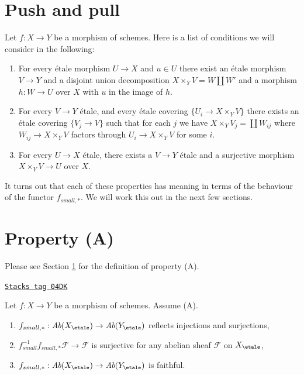 \section{Push and pull}
\label{etale-cohomology-section-monomorphisms}
Let $f : X \to Y$ be a morphism of schemes.
Here is a list of conditions we will consider in the following:
\begin{enumerate}
\item[(A)] For every \'etale morphism $U \to X$ and $u \in U$ there exist
an \'etale morphism $V \to Y$ and a disjoint union decomposition
$X \times_Y V = W \amalg W'$ and a morphism $h : W \to U$ over $X$
with $u$ in the image of $h$.
\item[(B)] For every $V \to Y$ \'etale, and every \'etale covering
$\{U_i \to X \times_Y V\}$ there exists an \'etale covering
$\{V_j \to V\}$ such that for each $j$ we have
$X \times_Y V_j = \coprod W_{ij}$ where $W_{ij} \to X \times_Y V$
factors through $U_i \to X \times_Y V$ for some $i$.
\item[(C)] For every $U \to X$ \'etale, there exists a $V \to Y$ \'etale
and a surjective morphism $X \times_Y V \to U$ over $X$.
\end{enumerate}
It turns out that each of these properties has meaning in terms of
the behaviour of the functor $f_{small, *}$. We will work this
out in the next few sections.

\section{Property (A)}
\label{etale-cohomology-section-A}
Please see Section \ref{etale-cohomology-section-monomorphisms} for the definition of property
(A).

\begin{lemma}
\label{etale-cohomology-lemma-property-A-implies}
\href{https://stacks.math.columbia.edu/tag/04DK}{\texttt{Stacks tag 04DK}}

Let $f : X \to Y$ be a morphism of schemes.
Assume (A).
\begin{enumerate}
\item
$f_{small, *} :
\textit{Ab}(X_\etale)
\to
\textit{Ab}(Y_\etale)$
reflects injections and surjections,
\item $f_{small}^{-1}f_{small, *}\mathcal{F} \to \mathcal{F}$
is surjective for any abelian sheaf $\mathcal{F}$ on $X_\etale$,
\item
$f_{small, *} :
\textit{Ab}(X_\etale)
\to
\textit{Ab}(Y_\etale)$
is faithful.
\end{enumerate}
\end{lemma}

